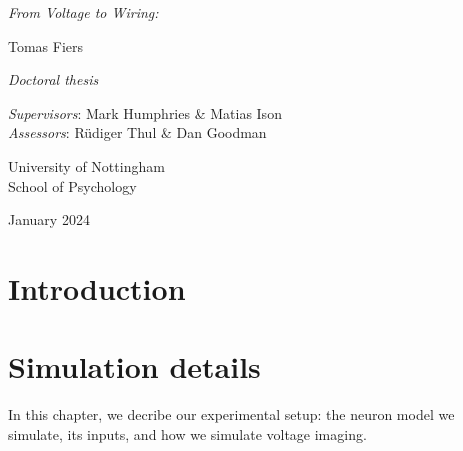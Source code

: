 \documentclass[a4paper, oneside, 11pt]{memoir}
\begin{document}
\begin{titlingpage}
    \let\prev=\parskip
    \setlength{\parskip}{1.6em}

    \vspace*{20em} %
    {\Large \emph{From Voltage to Wiring:}}\\

    \vspace{2em}

    Tomas Fiers

    \emph{Doctoral thesis}

    \vspace{1em}

    \emph{Supervisors}: Mark Humphries \& Matias Ison\\
    \emph{Assessors}: Rüdiger Thul \& Dan Goodman

    \vspace{1em}
    {\color{LighterBlack}  %

    University of Nottingham\\
    School of Psychology

    January 2024}

    \setlength{\parskip}{\prev}
    \vspace*{9em}
\end{titlingpage}



\vspace*{-6em}
\tableofcontents*







\chapter{Introduction}





\chapter{Simulation details}
\label{ch2}

In this chapter, we decribe our experimental setup: the neuron model we simulate, its inputs, and how we simulate voltage imaging.
\end{document}
